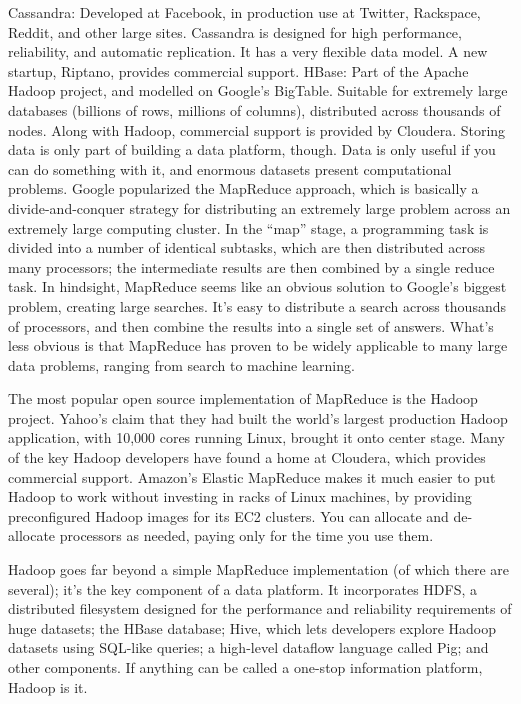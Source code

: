 Cassandra: Developed at Facebook, in production use at Twitter, Rackspace, Reddit, and other large sites. Cassandra is designed for high performance, reliability, and automatic replication. It has a very flexible data model. A new startup, Riptano, provides commercial support.
HBase: Part of the Apache Hadoop project, and modelled on Google’s BigTable. Suitable for extremely large databases (billions of rows, millions of columns), distributed across thousands of nodes. Along with Hadoop, commercial support is provided by Cloudera.
Storing data is only part of building a data platform, though. Data is only useful if you can do something with it, and enormous datasets present computational problems. Google popularized the MapReduce approach, which is basically a divide-and-conquer strategy for distributing an extremely large problem across an extremely large computing cluster. In the “map” stage, a programming task is divided into a number of identical subtasks, which are then distributed across many processors; the intermediate results are then combined by a single reduce task. In hindsight, MapReduce seems like an obvious solution to Google’s biggest problem, creating large searches. It’s easy to distribute a search across thousands of processors, and then combine the results into a single set of answers. What’s less obvious is that MapReduce has proven to be widely applicable to many large data problems, ranging from search to machine learning.

The most popular open source implementation of MapReduce is the Hadoop project. Yahoo’s claim that they had built the world’s largest production Hadoop application, with 10,000 cores running Linux, brought it onto center stage. Many of the key Hadoop developers have found a home at Cloudera, which provides commercial support. Amazon’s Elastic MapReduce makes it much easier to put Hadoop to work without investing in racks of Linux machines, by providing preconfigured Hadoop images for its EC2 clusters. You can allocate and de-allocate processors as needed, paying only for the time you use them.

Hadoop goes far beyond a simple MapReduce implementation (of which there are several); it’s the key component of a data platform. It incorporates HDFS, a distributed filesystem designed for the performance and reliability requirements of huge datasets; the HBase database; Hive, which lets developers explore Hadoop datasets using SQL-like queries; a high-level dataflow language called Pig; and other components. If anything can be called a one-stop information platform, Hadoop is it.

